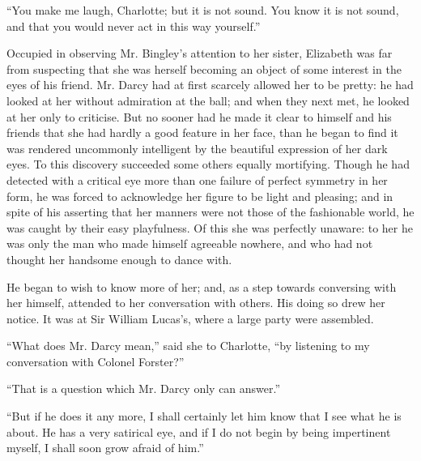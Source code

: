\documentclass[10pt]{book}
\begin{document}
   “You make me laugh, Charlotte; but it is not sound. You know it is not
sound, and that you would never act in this way yourself.”
  

   Occupied in observing Mr. Bingley’s attention to her sister, Elizabeth
was far from suspecting that she was herself becoming an object of some
interest in the eyes of his friend. Mr. Darcy had at first scarcely
allowed her to be pretty: he had looked at her without admiration at the
ball; and when they next met, he looked at her only to criticise. But no
sooner had he made it clear to himself and his friends that she had
hardly a good feature in her face, than he began to find it was rendered
uncommonly intelligent by the beautiful expression of her dark eyes. To
this discovery succeeded some others equally mortifying. Though he had
detected with a critical eye more than one failure of perfect symmetry
in her form, he was forced to acknowledge her figure to be light and
pleasing; and in spite of his asserting that her manners were not those
of the fashionable world, he was caught by their easy playfulness. Of
this she was perfectly unaware: to her he was only the man who made
himself agreeable nowhere, and who had not thought her handsome enough
to dance with.
  

   He began to wish to know more of her; and, as a step towards conversing
with her himself, attended to her conversation with others. His doing so
drew her notice. It was at Sir William Lucas’s, where a large party were
assembled.
  

   “What does Mr. Darcy mean,” said she to Charlotte, “by listening to my
conversation with Colonel Forster?”
  

   “That is a question which Mr. Darcy only can answer.”
  

   “But if he does it any more, I shall certainly let him know that I see
what he is about. He has a very
   satirical eye, and if I do not begin by
being impertinent myself, I shall soon grow afraid of him.”
  
\end{document}
